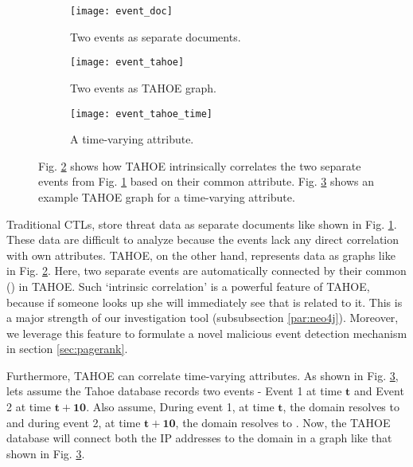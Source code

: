 \begin{figure}[!ht]
\begin{subfigure}{0.32\textwidth}
	\texttt{[image: event\_doc]} %
	\centering
	\caption{Two events as separate documents.}
	\label{fig:event_doc}
\end{subfigure}
\hfill
\begin{subfigure}{0.32\textwidth}
	\texttt{[image: event\_tahoe]} %
	\centering
	\caption{Two events as TAHOE graph.}
	\label{fig:event_tahoe}
\end{subfigure}
\hfill
\begin{subfigure}{0.32\textwidth}
	\texttt{[image: event\_tahoe\_time]} %
	\centering
	\caption{A time-varying attribute.}
	\label{fig:event_tahoe_time}
\end{subfigure}
    \caption{Fig. \ref{fig:event_tahoe} shows how TAHOE intrinsically correlates the two separate events from Fig. \ref{fig:event_doc} based on their common attribute. Fig. \ref{fig:event_tahoe_time} shows an example TAHOE graph for a time-varying attribute.}
    \label{fig:tahoe_corr}
\end{figure}

Traditional CTLs, store threat data as separate documents like shown in Fig. \ref{fig:event_doc}. These data are difficult to analyze because the events lack any direct correlation with own attributes. TAHOE, on the other hand, represents data as graphs like in Fig. \ref{fig:event_tahoe}. Here, two separate events are automatically connected by their common  () in TAHOE. Such `intrinsic correlation' is a powerful feature of TAHOE, because if someone looks up  she will immediately see that  is related to it. This is a major strength of our investigation tool (subsubsection \ref{par:neo4j}). Moreover, we leverage this feature to formulate a novel malicious event detection mechanism in section \ref{sec:pagerank}.

Furthermore, TAHOE can correlate time-varying attributes. As shown in Fig. \ref{fig:event_tahoe_time}, lets assume the Tahoe database records two events - Event 1 at time $\mathbf{t}$ and Event 2 at time $\mathbf{t+10}$. Also assume, During event 1, at time $\mathbf{t}$, the domain   resolves to  and during event 2, at time $\mathbf{t+10}$, the domain  resolves to . Now, the TAHOE database will connect both the IP addresses to the domain in a graph like that shown in Fig. \ref{fig:event_tahoe_time}.

